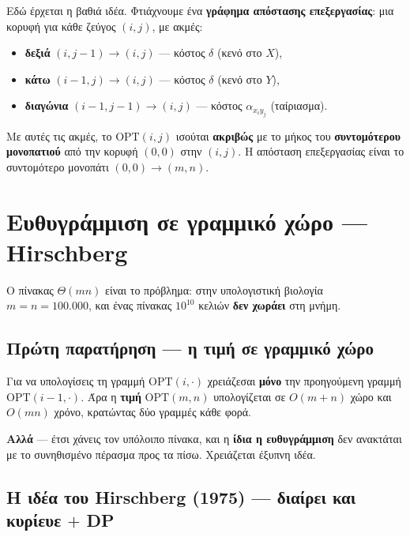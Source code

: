 \documentclass[11pt,a4paper]{article}
\begin{document}
Εδώ έρχεται η βαθιά ιδέα. Φτιάχνουμε ένα \textbf{γράφημα απόστασης επεξεργασίας}:
μια κορυφή για κάθε ζεύγος $(i, j)$, με ακμές:
\begin{itemize}
  \item \textbf{δεξιά} $(i, j-1) \to (i, j)$ --- κόστος $\delta$ (κενό στο $X$),
  \item \textbf{κάτω} $(i-1, j) \to (i, j)$ --- κόστος $\delta$ (κενό στο $Y$),
  \item \textbf{διαγώνια} $(i-1, j-1) \to (i, j)$ --- κόστος $\alpha_{x_i y_j}$
  (ταίριασμα).
\end{itemize}

\begin{keypoint}
Με αυτές τις ακμές, το $\text{OPT}(i, j)$ ισούται \textbf{ακριβώς} με το μήκος
του \textbf{συντομότερου μονοπατιού} από την κορυφή $(0, 0)$ στην $(i, j)$. Η
απόσταση επεξεργασίας είναι το συντομότερο μονοπάτι $(0,0) \to (m, n)$.
\end{keypoint}

\section{Ευθυγράμμιση σε γραμμικό χώρο --- Hirschberg}

Ο πίνακας $\Theta(mn)$ είναι το πρόβλημα: στην υπολογιστική βιολογία
$m = n = 100.000$, και ένας πίνακας $10^{10}$ κελιών \textbf{δεν χωράει} στη
μνήμη.

\subsection{Πρώτη παρατήρηση --- η τιμή σε γραμμικό χώρο}

Για να υπολογίσεις τη γραμμή $\text{OPT}(i, \cdot)$ χρειάζεσαι \textbf{μόνο} την
προηγούμενη γραμμή $\text{OPT}(i-1, \cdot)$. Άρα η \textbf{τιμή}
$\text{OPT}(m, n)$ υπολογίζεται σε $O(m + n)$ χώρο και $O(mn)$ χρόνο, κρατώντας
δύο γραμμές κάθε φορά.

\begin{warningbox}
\textbf{Αλλά} --- έτσι χάνεις τον υπόλοιπο πίνακα, και η \textbf{ίδια η
ευθυγράμμιση} δεν ανακτάται με το συνηθισμένο πέρασμα προς τα πίσω. Χρειάζεται
έξυπνη ιδέα.
\end{warningbox}

\subsection{Η ιδέα του Hirschberg (1975) --- διαίρει και κυρίευε $+$ DP}
\end{document}
